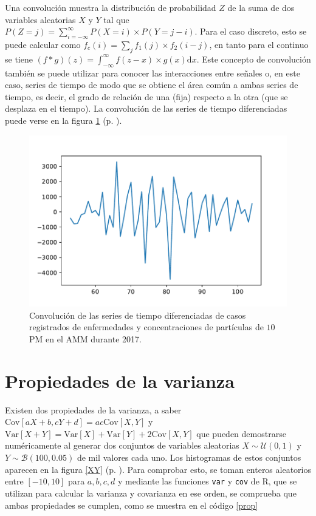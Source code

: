 \documentclass[paper=leter, fontsize=11pt]{scrartcl}
\begin{document}
Una convolución muestra la distribución de probabilidad $Z$ de la suma de dos variables aleatorias $X$ y $Y$ tal que $P(Z = j) = \sum_{i =
-\infty}^\infty P(X = i) \times P(Y = j - i)$. Para el caso discreto, esto se puede calcular como $f_c(i) = \sum_j f_1(j) \times f_2(i - j)$, en tanto para el continuo se tiene $(f \ast g)(z) = \int_{-\infty}^\infty f(z - x) \times g(x) \text{d} x$. Este concepto de convolución también se puede utilizar para conocer las interacciones entre señales o, en este caso, series de tiempo de modo que se obtiene el área común a ambas series de tiempo, es decir, el grado de relación de una (fija) respecto a la otra (que se desplaza en el tiempo). La convolución de las series de tiempo diferenciadas puede verse en la figura \ref{conv} (p. \pageref{conv}).

\begin{figure}
  \centering
  \includegraphics{2017_ingre_PM10_conv_semana.pdf}
\caption{Convolución de las series de tiempo diferenciadas de casos registrados de enfermedades y concentraciones de partículas de $10$ PM en el AMM durante 2017.}
\label{conv}
\end{figure}

\section{Propiedades de la varianza}
Existen dos propiedades de la varianza, a saber $\text{Cov}[aX + b, cY + d] = ac \text{Cov}[X, Y]$ y $\text{Var}[X + Y] = \text{Var}[X] + \text{Var}[Y] + 2 \text{Cov}[X, Y]$ que pueden demostrarse numéricamente al generar dos conjuntos de variables aleatorias $X \sim \mathcal{U}(0,1)$ y $Y \sim \mathcal{B} (100, 0.05)$ de mil valores cada uno. Los histogramas de estos conjuntos aparecen en la figura \ref{XY} (p. \pageref{XY}). Para comprobar esto, se toman enteros aleatorios entre $[-10, 10]$ para $a, b, c, d$ y mediante las funciones \texttt{var} y \texttt{cov} de R, que se utilizan para calcular la varianza y covarianza en ese orden, se comprueba que ambas propiedades se cumplen, como se muestra en el código \ref{prop}
\end{document}
